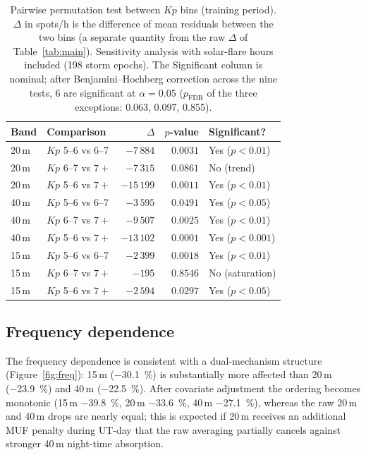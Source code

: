 \documentclass{agujournal2019}
\begin{document}
\begin{table}[h]
	\centering
	\caption{Pairwise permutation test between $Kp$ bins (training period).
		$\Delta$ in spots/h is the difference of mean residuals between the
		two bins (a separate quantity from the raw $\Delta$ of
		Table~\ref{tab:main}). Sensitivity analysis with solar-flare hours
		included (198 storm epochs). The Significant column is nominal;
		after Benjamini--Hochberg correction across the nine tests, 6 are
		significant at $\alpha = 0.05$ ($p_{\text{FDR}}$ of the three
		exceptions: 0.063, 0.097, 0.855).}
	\label{tab:pairwise}
	\begin{tabular}{llrrl}
		\toprule
		Band  & Comparison        & $\Delta$   & $p$-value & Significant?      \\
		\midrule
		20\,m & $Kp$ 5--6 vs 6--7 & $-7\,884$  & $0.0031$  & Yes ($p < 0.01$)  \\
		20\,m & $Kp$ 6--7 vs $7+$ & $-7\,315$  & $0.0861$  & No (trend)        \\
		20\,m & $Kp$ 5--6 vs $7+$ & $-15\,199$ & $0.0011$  & Yes ($p < 0.01$)  \\
		40\,m & $Kp$ 5--6 vs 6--7 & $-3\,595$  & $0.0491$  & Yes ($p < 0.05$)  \\
		40\,m & $Kp$ 6--7 vs $7+$ & $-9\,507$  & $0.0025$  & Yes ($p < 0.01$)  \\
		40\,m & $Kp$ 5--6 vs $7+$ & $-13\,102$ & $0.0001$  & Yes ($p < 0.001$) \\
		15\,m & $Kp$ 5--6 vs 6--7 & $-2\,399$  & $0.0018$  & Yes ($p < 0.01$)  \\
		15\,m & $Kp$ 6--7 vs $7+$ & $-195$     & $0.8546$  & No (saturation)   \\
		15\,m & $Kp$ 5--6 vs $7+$ & $-2\,594$  & $0.0297$  & Yes ($p < 0.05$)  \\
		\bottomrule
	\end{tabular}
\end{table}

\subsection{Frequency dependence}

The frequency dependence is consistent with a dual-mechanism structure
(Figure~\ref{fig:freq}): 15\,m (\SI{-30.1}{\percent}) is substantially more
affected than 20\,m (\SI{-23.9}{\percent}) and 40\,m
(\SI{-22.5}{\percent}). After covariate adjustment the ordering becomes
monotonic (15\,m \SI{-39.8}{\percent}, 20\,m \SI{-33.6}{\percent},
40\,m \SI{-27.1}{\percent}), whereas the raw 20\,m and 40\,m drops are nearly
equal; this is expected if 20\,m receives an additional MUF penalty during
UT-day that the raw averaging partially cancels against stronger 40\,m
night-time absorption.
\end{document}
